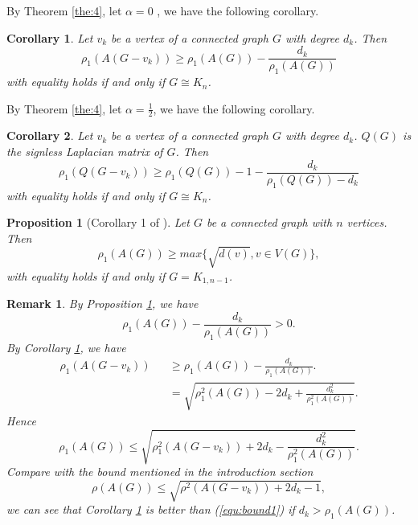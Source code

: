 \documentclass[amsthm]{elsart}
\newtheorem{corollary}{Corollary}[section]
\newtheorem{proposition}{Proposition}[section]
\newtheorem{remark}{Remark}[section]
\begin{document}
By Theorem \ref{the:4}, let $\alpha = 0$ , we have the following corollary.
\begin{corollary} \label{coro:4}
Let $v_k$ be a vertex of a connected graph $G$ with degree $d_k$.  Then
\begin{equation} \label{equ:coro4}
\rho _1 (A(G - v_k))
  \geqslant \rho _1(A(G)) - \frac{d_k}{\rho _1(A(G))}
\end{equation}
with equality holds if and only if $G \cong K_n$.
\end{corollary}

By Theorem \ref{the:4}, let $\alpha = \frac{1}{2}$, we have the following corollary.
\begin{corollary} \label{coro:5}
Let $v_k$ be a vertex of a connected graph $G$ with degree $d_k$. $Q(G)$  is the signless Laplacian matrix of $G$. Then
\begin{equation} \label{equ:coro5}
\rho _1 (Q(G - v_k))
  \geqslant \rho _1(Q(G)) - 1 - \frac{d_k}{\rho _1(Q(G)) - d_k}
\end{equation}
with equality holds if and only if $G \cong K_n$.
\end{corollary}


\begin{proposition} [Corollary 1 of \cite{2019Sharp}] \label{prop:remark1}
Let $G$ be a connected graph with $n$ vertices. Then
$$ \rho_1(A(G)) \geqslant max \{ \sqrt{d(v)},  v \in V(G)  \}, $$
with equality holds if and only if $G = K_{1,n-1}$.
\end{proposition}

\begin{remark} \label{remark:1}
By Proposition \ref{prop:remark1}, we have
\begin{equation*}
\rho _1(A(G)) - \frac{d_k}{\rho _1(A(G))} > 0.
\end{equation*}
By Corollary \ref{coro:4}, we have
\begin{eqnarray*}
\rho _1 (A(G - v_k))
&& \geqslant \rho _1(A(G)) - \frac{d_k}{\rho _1(A(G))}.
\\ && = \sqrt{\rho _1^2(A(G)) - 2d_k + \frac{d_k^2}{\rho _1^2(A(G))}}.
\end{eqnarray*}
Hence
\begin{equation*}
\rho _1(A(G)) \leqslant \sqrt{\rho _1^2 (A(G - v_k)) + 2 d_k - \frac{d_k^2}{\rho _1^2(A(G))}}.
\end{equation*}
 Compare with the bound \cite{2019A} mentioned in the introduction section
 \begin{equation} \label{equ:bound1}
 \rho(A(G)) \leqslant \sqrt{\rho^2(A(G - v_k)) + 2 d_k - 1},
 \end{equation}
 we can see that Corollary \ref{coro:4} is better than (\ref{equ:bound1}) if $ d_k > \rho _1(A(G))$.
\end{remark}
\end{document}
